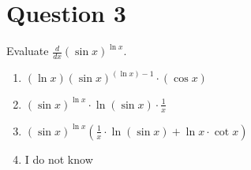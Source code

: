 
\section*{Question 3}
Evaluate $\frac{d}{dx}(\sin x)^{\ln x}$.  
    
\begin{enumerate}[label = \alph*.]
    \item $(\ln x)(\sin x)^{(\ln x)-1}\cdot(\cos x)$
    \item $(\sin x)^{\ln x}\cdot\ln(\sin x)\cdot\frac{1}{x}$
    \item $(\sin x)^{\ln x}\left(\frac{1}{x}\cdot\ln(\sin x)+\ln x\cdot\cot x\right)$
    \item I do not know
\end{enumerate}

\setcounter{solutionMainStep}{0}
\setcounter{solutionSubStep}{0}


